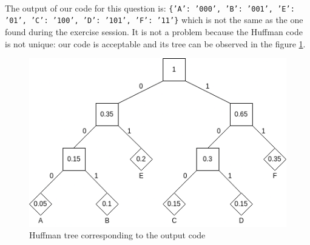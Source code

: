 \documentclass[a4paper, 11pt, oneside]{article}
\begin{document}
\paragraph{}The output of our code for this question is: \texttt{\{'A': '000', 'B': '001', 'E': '01', 'C': '100', 'D': '101', 'F': '11'\}} which is not
the same as the one found during the exercise session. It is not a problem because the Huffman code is not unique: our code is acceptable and its tree can be observed in the figure \ref{fig:huffman_tree}.

\begin{figure}[H]
    \center
    \includegraphics[scale=0.7]{huffman_tree.png}
    \caption{Huffman tree corresponding to the output code}
    \label{fig:huffman_tree}
    \end{figure}
\end{document}
